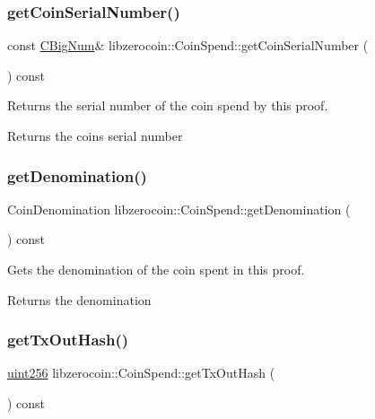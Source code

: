 \subsubsection{\texorpdfstring{get\+Coin\+Serial\+Number()}{getCoinSerialNumber()}}
{\footnotesize\ttfamily const \mbox{\hyperlink{class_c_big_num}{C\+Big\+Num}}\& libzerocoin\+::\+Coin\+Spend\+::get\+Coin\+Serial\+Number (\begin{DoxyParamCaption}{ }\end{DoxyParamCaption}) const\hspace{0.3cm}{\ttfamily [inline]}}

Returns the serial number of the coin spend by this proof.

\begin{DoxyReturn}{Returns}
the coin\textquotesingle{}s serial number 
\end{DoxyReturn}
\mbox{\label{classlibzerocoin_1_1_coin_spend_a1e36726a516e8b0a110fa40afbcc76bc}} 
\subsubsection{\texorpdfstring{get\+Denomination()}{getDenomination()}}
{\footnotesize\ttfamily Coin\+Denomination libzerocoin\+::\+Coin\+Spend\+::get\+Denomination (\begin{DoxyParamCaption}{ }\end{DoxyParamCaption}) const\hspace{0.3cm}{\ttfamily [inline]}}

Gets the denomination of the coin spent in this proof.

\begin{DoxyReturn}{Returns}
the denomination 
\end{DoxyReturn}
\mbox{\label{classlibzerocoin_1_1_coin_spend_a58d9ad8806aac3e37ff1110d95a12bbb}} 
\subsubsection{\texorpdfstring{get\+Tx\+Out\+Hash()}{getTxOutHash()}}
{\footnotesize\ttfamily \mbox{\hyperlink{classuint256}{uint256}} libzerocoin\+::\+Coin\+Spend\+::get\+Tx\+Out\+Hash (\begin{DoxyParamCaption}{ }\end{DoxyParamCaption}) const\hspace{0.3cm}{\ttfamily [inline]}}

